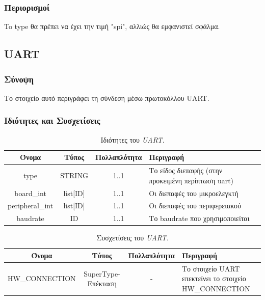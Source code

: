 \subsubsection*{Περιορισμοί}

\noindent To type θα πρέπει να έχει την τιμή "spi", αλλιώς θα εμφανιστεί σφάλμα.

\subsection{UART}
\label{subsec:uart_con}

\subsubsection*{Σύνοψη}

\noindent Το στοιχείο αυτό περιγράφει τη σύνδεση μέσω πρωτοκόλλου UART.

\subsubsection*{Ιδιότητες και Συσχετίσεις}

\begin{table}[H]
	\begin{center}
		\caption{Ιδιότητες του \textit{UART}.}
		\label{tab:uart_con1}
		\begin{tabular}{ | c | c | c| m{5.5cm} | }
			\hline
			\rowcolor{Gray}
			Όνομα & Τύπος & Πολλαπλότητα & Περιγραφή \\
			\hline
			type & STRING & 1..1 & Το είδος διεπαφής (στην προκειμένη περίπτωση uart) \\
			\hline
			board\_int & list[ID] & 1..1 & Οι διεπαφές του μικροελεγκτή \\
			\hline
			peripheral\_int & list[ID] & 1..1 & Οι διεπαφές του περιφερειακού \\
			\hline
			baudrate & ID & 1..1 & Το baudrate που χρησιμοποιείται \\
			\hline
		\end{tabular}
	\end{center}
\end{table}

\begin{table}[H]
	\begin{center}
		\caption{Συσχετίσεις του \textit{UART}.}
		\label{tab:uart_con2}
		\begin{tabular}{ | c | c | c| m{5.5cm} | }
			\hline
			\rowcolor{Gray}
			Όνομα & Τύπος & Πολλαπλότητα & Περιγραφή \\
			\hline
			\footnotesize{HW\_CONNECTION} & SuperType-Επέκταση & - &  Το στοιχείο UART επεκτείνει το στοιχείο HW\_CONNECTION \\
			\hline
		\end{tabular}
	\end{center}
\end{table}

